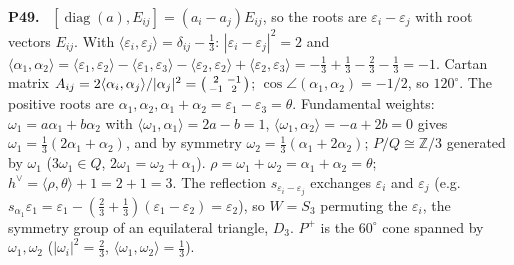 \documentclass[11pt]{article}
\newcommand{\Z}{\mathbb{Z}}
\newenvironment{solution}[1]{\medskip\noindent\textbf{P#1.}\ }{\par\medskip}
\begin{document}
\begin{solution}{49}
$[\operatorname{diag}(a),E_{ij}] = (a_i-a_j)E_{ij}$, so the roots are
$\varepsilon_i-\varepsilon_j$ with root vectors $E_{ij}$. With
$\langle\varepsilon_i,\varepsilon_j\rangle = \delta_{ij}-\tfrac13$:
$|\varepsilon_i-\varepsilon_j|^2 = 2$ and
$\langle\alpha_1,\alpha_2\rangle = \langle\varepsilon_1,\varepsilon_2\rangle-\langle\varepsilon_1,\varepsilon_3\rangle-\langle\varepsilon_2,\varepsilon_2\rangle+\langle\varepsilon_2,\varepsilon_3\rangle
= -\tfrac13+\tfrac13-\tfrac23-\tfrac13 = -1$. Cartan matrix
$A_{ij} = 2\langle\alpha_i,\alpha_j\rangle/|\alpha_j|^2 = \begin{psmallmatrix}2&-1\\-1&2\end{psmallmatrix}$;
$\cos\angle(\alpha_1,\alpha_2) = -1/2$, so $120^\circ$. The positive roots
are $\alpha_1,\alpha_2,\alpha_1+\alpha_2 = \varepsilon_1-\varepsilon_3 = \theta$.
Fundamental weights: $\omega_1 = a\alpha_1+b\alpha_2$ with
$\langle\omega_1,\alpha_1\rangle = 2a-b = 1$, $\langle\omega_1,\alpha_2\rangle = -a+2b = 0$
gives $\omega_1 = \tfrac13(2\alpha_1+\alpha_2)$, and by symmetry
$\omega_2 = \tfrac13(\alpha_1+2\alpha_2)$; $P/Q\cong\Z/3$ generated by
$\omega_1$ ($3\omega_1\in Q$, $2\omega_1 = \omega_2+\alpha_1$).
$\rho = \omega_1+\omega_2 = \alpha_1+\alpha_2 = \theta$;
$h^\vee = \langle\rho,\theta\rangle+1 = 2+1 = 3$. The reflection
$s_{\varepsilon_i-\varepsilon_j}$ exchanges $\varepsilon_i$ and
$\varepsilon_j$ (e.g.\ $s_{\alpha_1}\varepsilon_1 = \varepsilon_1-(\tfrac23+\tfrac13)(\varepsilon_1-\varepsilon_2) = \varepsilon_2$),
so $W = S_3$ permuting the $\varepsilon_i$, the symmetry group of an
equilateral triangle, $D_3$. $P^+$ is the $60^\circ$ cone spanned by
$\omega_1,\omega_2$ ($|\omega_i|^2 = \tfrac23$, $\langle\omega_1,\omega_2\rangle = \tfrac13$).
\end{solution}
\end{document}
